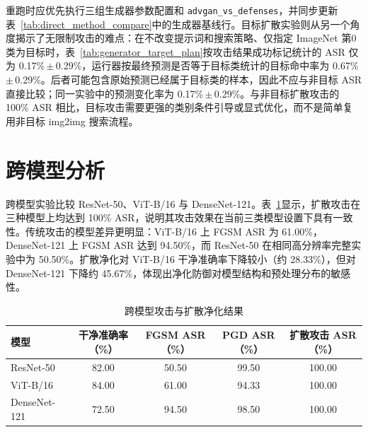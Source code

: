 \documentclass[type=bachelor,oneside]{fduthesis}
\newcommand{\tablefont}{\small}
\begin{document}
\begin{table}[htbp]
  \centering
  \caption{生成器基线重跑占位与目标扩散攻击补充结果}
  \label{tab:generator_target_plan}
  \tablefont
  \setlength{\tabcolsep}{4pt}
\end{table}

重跑时应优先执行三组生成器参数配置和 \texttt{advgan\_vs\_defenses}，并同步更新表~\ref{tab:direct_method_compare}中的生成器基线行。目标扩散实验则从另一个角度揭示了无限制攻击的难点：在不改变提示词和搜索策略、仅指定 ImageNet 第0类为目标时，表~\ref{tab:generator_target_plan}按攻击结果成功标记统计的 ASR 仅为 0.17\%\,$\pm$\,0.29\%，运行器按最终预测是否等于目标类统计的目标命中率为 0.67\%\,$\pm$\,0.29\%。后者可能包含原始预测已经属于目标类的样本，因此不应与非目标 ASR 直接比较；同一实验中的预测变化率为 0.17\%\,$\pm$\,0.29\%。与非目标扩散攻击的 100\% ASR 相比，目标攻击需要更强的类别条件引导或显式优化，而不是简单复用非目标 img2img 搜索流程。

\section{跨模型分析}

跨模型实验比较 ResNet-50、ViT-B/16 与 DenseNet-121。表~\ref{tab:cross_model_new}显示，扩散攻击在三种模型上均达到 100\% ASR，说明其攻击效果在当前三类模型设置下具有一致性。传统攻击的模型差异更明显：ViT-B/16 上 FGSM ASR 为 61.00\%，DenseNet-121 上 FGSM ASR 达到 94.50\%，而 ResNet-50 在相同高分辨率完整实验中为 50.50\%。扩散净化对 ViT-B/16 干净准确率下降较小（约 28.33\%），但对 DenseNet-121 下降约 45.67\%，体现出净化防御对模型结构和预处理分布的敏感性。

\begin{table}[htbp]
  \centering
  \caption{跨模型攻击与扩散净化结果}
  \label{tab:cross_model_new}
  \tablefont
  \setlength{\tabcolsep}{4pt}
  \begin{tabular}{lcccc}
    \toprule
    模型 & 干净准确率（\%） & FGSM ASR（\%） & PGD ASR（\%） & 扩散攻击 ASR（\%） \\
    \midrule
    ResNet-50 & 82.00 & 50.50 & 99.50 & 100.00 \\
    ViT-B/16 & 84.00 & 61.00 & 94.33 & 100.00 \\
    DenseNet-121 & 72.50 & 94.50 & 98.50 & 100.00 \\
    \bottomrule
  \end{tabular}
\end{table}
\end{document}
